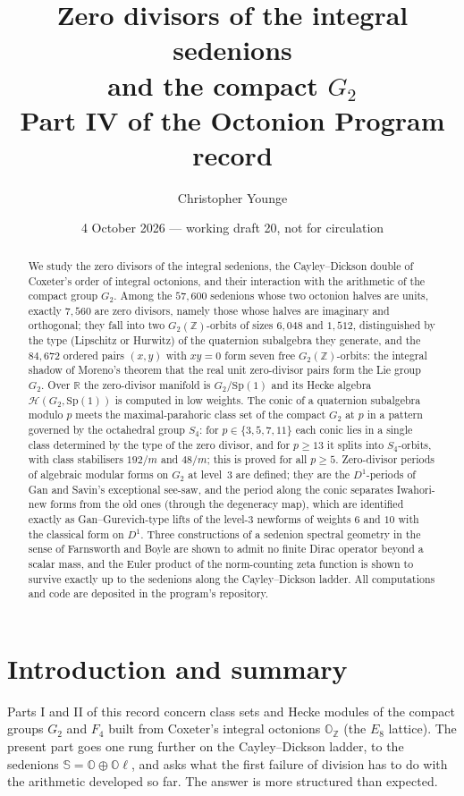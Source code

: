 \documentclass[11pt]{amsart}
\title[Zero divisors of the integral sedenions]{Zero divisors of the integral sedenions\\ and the compact $G_2$\\[4pt] {\normalsize Part IV of the Octonion Program record}}
\author{Christopher Younge}
\date{4 October 2026 --- working draft 20, not for circulation}
\theoremstyle{definition}
\renewcommand{\O}{\mathbb{O}}\newcommand{\Sd}{\mathbb{S}}\newcommand{\Hq}{\mathbb{H}}\newcommand{\Z}{\mathbb{Z}}\newcommand{\Q}{\mathbb{Q}}\newcommand{\R}{\mathbb{R}}\newcommand{\C}{\mathbb{C}}\newcommand{\F}{\mathbb{F}}
\begin{document}
\begin{abstract}
We study the zero divisors of the integral sedenions, the Cayley--Dickson double of Coxeter's order of integral octonions, and their interaction with the arithmetic of the compact group $G_2$. Among the $57{,}600$ sedenions whose two octonion halves are units, exactly $7{,}560$ are zero divisors, namely those whose halves are imaginary and orthogonal; they fall into two $G_2(\Z)$-orbits of sizes $6{,}048$ and $1{,}512$, distinguished by the type (Lipschitz or Hurwitz) of the quaternion subalgebra they generate, and the $84{,}672$ ordered pairs $(x,y)$ with $xy=0$ form seven free $G_2(\Z)$-orbits: the integral shadow of Moreno's theorem that the real unit zero-divisor pairs form the Lie group $G_2$. Over $\R$ the zero-divisor manifold is $G_2/\mathrm{Sp}(1)$ and its Hecke algebra $\mathcal H(G_2,\mathrm{Sp}(1))$ is computed in low weights. The conic of a quaternion subalgebra modulo $p$ meets the maximal-parahoric class set of the compact $G_2$ at $p$ in a pattern governed by the octahedral group $S_4$: for $p\in\{3,5,7,11\}$ each conic lies in a single class determined by the type of the zero divisor, and for $p\ge 13$ it splits into $S_4$-orbits, with class stabilisers $192/m$ and $48/m$; this is proved for all $p\ge 5$. Zero-divisor periods of algebraic modular forms on $G_2$ at level~3 are defined; they are the $D^1$-periods of Gan and Savin's exceptional see-saw, and the period along the conic separates Iwahori-new forms from the old ones (through the degeneracy map), which are identified exactly as Gan--Gurevich-type lifts of the level-$3$ newforms of weights $6$ and $10$ with the classical form on $D^1$. Three constructions of a sedenion spectral geometry in the sense of Farnsworth and Boyle are shown to admit no finite Dirac operator beyond a scalar mass, and the Euler product of the norm-counting zeta function is shown to survive exactly up to the sedenions along the Cayley--Dickson ladder. All computations and code are deposited in the program's repository.
\end{abstract}
\maketitle
\tableofcontents

\section{Introduction and summary}
Parts I and II of this record \cite{PartI,PartII} concern class sets and Hecke modules of the compact groups $G_2$ and $F_4$ built from Coxeter's integral octonions $\O_\Z$ (the $E_8$ lattice). The present part goes one rung further on the Cayley--Dickson ladder, to the sedenions $\Sd=\O\oplus\O\ell$, and asks what the first failure of division has to do with the arithmetic developed so far. The answer is more structured than expected.
\end{document}
